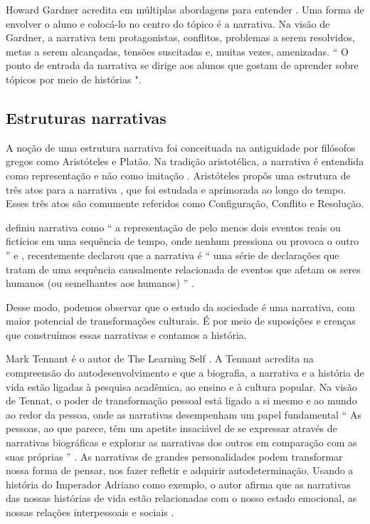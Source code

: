 Howard Gardner acredita em múltiplas abordagens para entender \citep{gardner_disciplined_2021}. Uma forma de envolver o aluno e colocá-lo no centro do tópico é a narrativa. Na visão de Gardner, a narrativa tem protagonistas, conflitos, problemas a serem resolvidos, metas a serem alcançadas, tensões suscitadas e, muitas vezes, amenizadas. `` O ponto de entrada da narrativa se dirige aos alunos que gostam de aprender sobre tópicos por meio de histórias "\citep{illeris_multiple_2018}.

\subsection{Estruturas narrativas}

A noção de uma estrutura narrativa foi conceituada na antiguidade por filósofos gregos como Aristóteles e Platão\citep {page_new_2011}. Na tradição aristotélica, a narrativa é entendida como representação e não como imitação \citep{hamburger_logic_1973}. Aristóteles propôs uma estrutura de três atos para a narrativa \citep{brutsch_three-act_2015, wedin_aristotles_2000}, que foi estudada e aprimorada ao longo do tempo. Esses três atos são comumente referidos como Configuração, Conflito e Resolução.

\citet{prince_narratology_1982} definiu narrativa como `` a representação de pelo menos dois eventos reais ou fictícios em uma sequência de tempo, onde nenhum pressiona ou provoca o outro '' e \citeauthor{cohn_transparent_1984}, recentemente declarou que a narrativa é `` uma série de declarações que tratam de uma sequência causalmente relacionada de eventos que afetam os seres humanos (ou semelhantes aos humanos) '' \citep{cohn_distinction_2000}.

Desse modo, podemos observar que o estudo da sociedade é uma narrativa, com maior potencial de transformações culturais. É por meio de suposições e crenças que construímos essas narrativas e contamos a história.

Mark Tennant é o autor de The Learning Self \citep{tennant_learning_2012}. A Tennant acredita na compreensão do autodesenvolvimento e que a biografia, a narrativa e a história de vida estão ligadas à pesquisa acadêmica, ao ensino e à cultura popular. Na visão de Tennat, o poder de transformação pessoal está ligado a si mesmo e ao mundo ao redor da pessoa, onde as narrativas desempenham um papel fundamental `` As pessoas, ao que parece, têm um apetite insaciável de se expressar através de narrativas biográficas e explorar as narrativas dos outros em comparação com as suas próprias '' \citep{illeris_life_2018}. As narrativas de grandes personalidades podem transformar nossa forma de pensar, nos fazer refletir e adquirir autodeterminação. Usando a história do Imperador Adriano como exemplo, o autor afirma que as narrativas das nossas histórias de vida estão relacionadas com o nosso estado emocional, as nossas relações interpessoais e sociais \citep{illeris_life_2018}.

